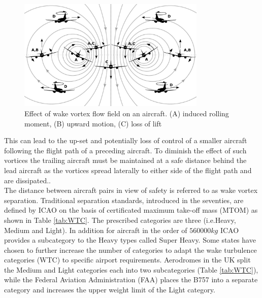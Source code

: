 \begin{figure}
    \centering
    \includegraphics[width=0.8\textwidth]{graphics/reaction_in_wake.jpg}
    \caption[Wake vortex encounter]{Effect of wake vortex flow field on an aircraft. (A) induced rolling moment, (B) upward motion, (C) loss of lift  \cite{Hallock2018Apr}} \label{fig:vortex_encounter}
\end{figure}

This can lead to the up-set and potentially loss of control of a smaller aircraft following the flight path of a preceding aircraft.
To diminish the effect of such vortices the trailing aircraft must be maintained at a safe distance behind the lead aircraft as the vortices spread laterally to either side of the flight path and are dissipated.\cite{Breitsamter2011Feb}. \\
The distance between aircraft pairs in view of safety is referred to as wake vortex separation. 
Traditional separation standards, introduced in the seventies, are defined by ICAO  on the basis of certificated maximum take-off mass (MTOM) as shown in Table \ref{tab:WTC}. The prescribed categories are three (i.e.Heavy, Medium and Light). In addition for aircraft in the order of $560000kg$ ICAO provides a subcategory to the Heavy types called Super Heavy. Some states have chosen to further increase the number of categories to adapt the wake turbulence categories (WTC) to specific airport requirements. Aerodromes in the UK split the Medium and Light categories each into two subcategories (Table \ref{tab:WTC}), while the Federal Aviation Administration (FAA) places the B757 into a separate category and increases the upper weight limit of the Light category. \cite{icao_wtc, uk_aeronautical_information_services_wake_2017, noauthor_recat_2018}

